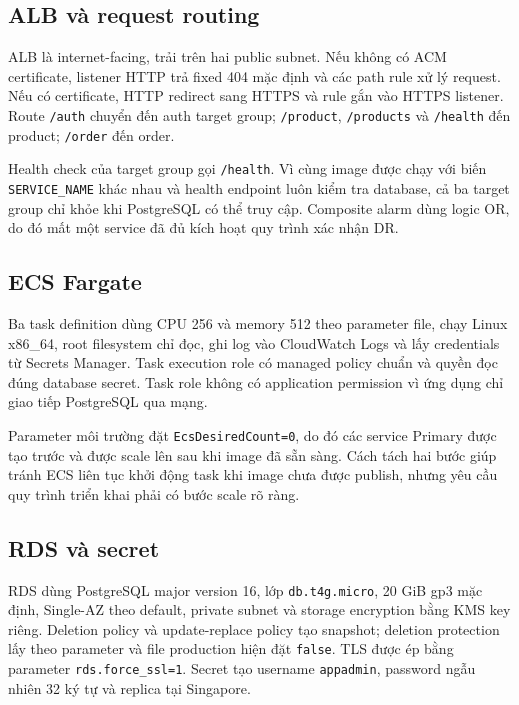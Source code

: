 \subsection{ALB và request routing}

ALB là internet-facing, trải trên hai public subnet. Nếu không có ACM certificate, listener HTTP trả fixed 404 mặc định và các path rule xử lý request. Nếu có certificate, HTTP redirect sang HTTPS và rule gắn vào HTTPS listener. Route \texttt{/auth} chuyển đến auth target group; \texttt{/product}, \texttt{/products} và \texttt{/health} đến product; \texttt{/order} đến order.

Health check của target group gọi \texttt{/health}. Vì cùng image được chạy với biến \texttt{SERVICE\_NAME} khác nhau và health endpoint luôn kiểm tra database, cả ba target group chỉ khỏe khi PostgreSQL có thể truy cập. Composite alarm dùng logic OR, do đó mất một service đã đủ kích hoạt quy trình xác nhận DR.

\subsection{ECS Fargate}

Ba task definition dùng CPU 256 và memory 512 theo parameter file, chạy Linux x86\_64, root filesystem chỉ đọc, ghi log vào CloudWatch Logs và lấy credentials từ Secrets Manager. Task execution role có managed policy chuẩn và quyền đọc đúng database secret. Task role không có application permission vì ứng dụng chỉ giao tiếp PostgreSQL qua mạng.

Parameter môi trường đặt \texttt{EcsDesiredCount=0}, do đó các service Primary được tạo trước và được scale lên sau khi image đã sẵn sàng. Cách tách hai bước giúp tránh ECS liên tục khởi động task khi image chưa được publish, nhưng yêu cầu quy trình triển khai phải có bước scale rõ ràng.

\subsection{RDS và secret}

RDS dùng PostgreSQL major version 16, lớp \texttt{db.t4g.micro}, 20 GiB gp3 mặc định, Single-AZ theo default, private subnet và storage encryption bằng KMS key riêng. Deletion policy và update-replace policy tạo snapshot; deletion protection lấy theo parameter và file production hiện đặt \texttt{false}. TLS được ép bằng parameter \texttt{rds.force\_ssl=1}. Secret tạo username \texttt{appadmin}, password ngẫu nhiên 32 ký tự và replica tại Singapore.


